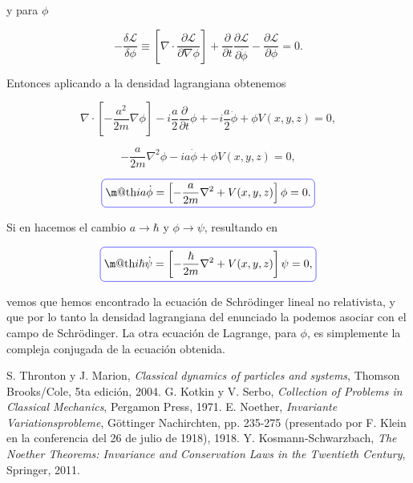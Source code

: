 \documentclass[a4paper,10pt]{article}
\makeatletter
\numberwithin{equation}{section}
\newcommand*{\boxcolor}{blue}
\renewcommand{\boxed}[1]{\textcolor{\boxcolor}{%
\tikz[baseline={([yshift=-1ex]current bounding box.center)}] \node [rectangle, minimum width=1ex,rounded corners,draw] {\normalcolor\m@th$\displaystyle#1$};}}
\makeatother
\begin{document}
y para $\phi$ 

\begin{equation}
 - \frac{\delta\mathcal{L}}{\delta \phi} \equiv 
 \left[ \nabla \cdot \frac{\partial \mathcal{L}}{\partial \nabla \phi} \right] 
 + \frac{\partial}{\partial t}\frac{\partial \mathcal{L}}{\partial \dot{\phi}} 
 - \frac{\partial \mathcal{L}}{\partial \phi} = 0.
 \label{eq:shro2}
\end{equation}

Entonces aplicando  a la densidad lagrangiana obtenemos 

\begin{equation}
 \nabla \cdot \left[ - \frac{a^2}{2m}\nabla\phi \right] - 
 i\frac{a}{2}\frac{\partial}{\partial t} \phi + - i\frac{a}{2}\dot{\phi} + 
 \phi V(x,y,z) = 0,
\end{equation}

\begin{equation}
 -\frac{a}{2m}\nabla^2 \phi - ia\dot{\phi} + \phi V(x,y,z) = 0,
\end{equation}

\begin{equation}
 \boxed{ia\dot{\phi} = \left[-\frac{a}{2m}\nabla^2 + V(x,y,z)\right]\phi = 0.}
 \label{eq:shro3}
\end{equation}

Si en  hacemos el cambio $a \rightarrow \hbar$ y $\phi \rightarrow \psi$, 
resultando en

\begin{equation}
 \boxed{i\hbar\dot{\psi} = \left[-\frac{\hbar}{2m}\nabla^2 + V(x,y,z)\right]\psi = 0,}
 \label{eq:shro4}
\end{equation}

vemos que hemos encontrado la ecuación de Schrödinger lineal no relativista, y que 
por lo tanto la densidad lagrangiana del enunciado la podemos asociar con el 
campo de Schrödinger. La otra ecuación de Lagrange, para $\phi$, es simplemente la compleja 
conjugada de la ecuación obtenida.


\begin{thebibliography}{10}
 S. Thronton y J. Marion, \emph{Classical dynamics of particles and systems}, Thomson Brooks/Cole,
 5ta edición, 2004.
 G. Kotkin y V. Serbo, \emph{Collection of Problems in Classical Mechanics}, 
 Pergamon Press, 1971.
E. Noether, \emph{Invariante Variationsprobleme}, Göttinger Nachirchten, pp. 235-275
(presentado por F. Klein en la conferencia del 26 de julio de 1918), 1918.
Y. Kosmann-Schwarzbach, \emph{The Noether Theorems: Invariance and Conservation Laws 
in the Twentieth Century}, Springer, 2011.


\end{thebibliography}
\end{document}
